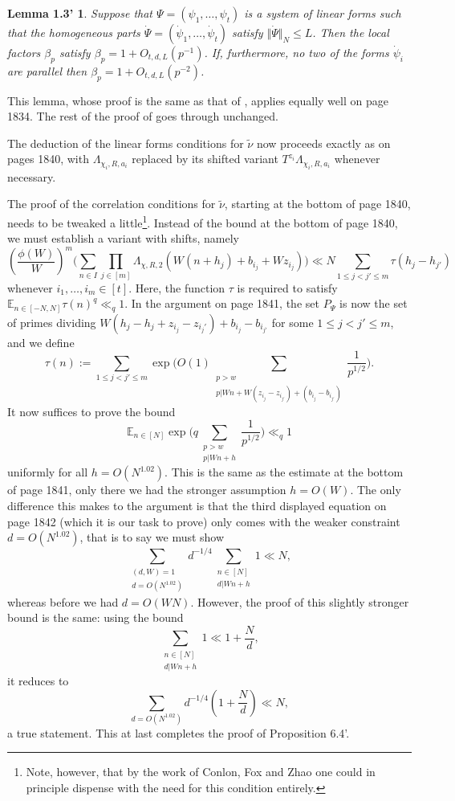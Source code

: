 \documentclass[11pt]{amsart}
\numberwithin{equation}{section}  %
\theoremstyle{remark}
\theoremstyle{plain}
\newtheorem*{lem13new}{Lemma 1.3'}
\numberwithin{equation}{section}
\newcommand{\E}{\mathbb{E}}  %
\renewcommand{\leq}{\leqslant}
\renewcommand{\(}{\left(}
\renewcommand{\)}{\right)}
\begin{document}
\begin{lem13new} Suppose that $\Psi = (\psi_1,\dots, \psi_t)$ is a system of linear forms such that the homogeneous parts $\dot\Psi = (\dot\psi_1,\dots,\dot\psi_t)$ satisfy $\Vert \dot\Psi\Vert_N \leq L$. Then the local factors $\beta_p$ satisfy $\beta_p = 1 + O_{t,d,L}(p^{-1})$. If, furthermore, no two of the forms $\dot\psi_i$ are parallel then $\beta_p = 1 + O_{t,d,L}(p^{-2})$.
\end{lem13new}

This lemma, whose proof is the same as that of \cite[Lemma 1.3]{gt-linearprimes}, applies equally well on page 1834. The rest of the proof of \cite[Theorem D.3]{gt-linearprimes} goes through unchanged.


The deduction of the linear forms conditions for $\tilde\nu$ now proceeds exactly as on pages 1840, with $\Lambda_{\chi_i,R,a_i}$ replaced by its shifted variant $T^{z_i} \Lambda_{\chi_i, R, a_i}$ whenever necessary.

The proof of the correlation conditions for $\tilde \nu$, starting at the bottom of page 1840, needs to be tweaked a little\footnote{Note, however, that by the work of Conlon, Fox and Zhao \cite{cfz} one could in principle dispense with the need for this condition entirely.}. Instead of the bound at the bottom of page 1840, we must establish a variant with shifts, namely
\[ \left(\frac{\phi(W)}{W}\right)^m \Bigg(\sum_{n \in I}\prod_{j \in [m]} \Lambda_{\chi, R, 2}(W(n + h_j)+ b_{i_j} + Wz_{i_j})  \Bigg) \ll N \sum_{1 \leq j < j' \leq m}\tau(h_j - h_{j'})\] whenever $i_1,\dots, i_m \in [t]$. Here, the function $\tau$ is required to satisfy $\E_{n \in [-N,N]} \tau(n)^q \ll_q 1$. In the argument on page 1841, the set $P_{\Psi}$ is now the set of primes dividing $W(h_j - h_{j} + z_{i_j} - z_{i_j'}) + b_{i_j} - b_{i_{j'}}$ for some $1 \leq j < j' \leq m$, and we define
\[ \tau(n) := \sum_{1 \leq j < j' \leq m} \exp \Bigg(O  (1)\sum_{\substack{p > w \\ p | Wn + W(z_{i_j} - z_{i_{j'}}) + (b_{i_j} - b_{i_{j'}})}} \frac{1}{p^{1/2} }\Bigg) .\]
It now suffices to prove the bound
\[ \E_{n \in [N]} \exp\Bigg(q \sum_{\substack{p > w \\ p | Wn + h}} \frac{1}{p^{1/2}}\Bigg) \ll_q 1\] uniformly for all $h = O(N^{1.02})$. This is the same as the estimate at the bottom of page 1841, only there we had the stronger assumption $h = O(W)$. The only difference this makes to the argument is that the third displayed equation on page 1842 (which it is our task to prove) only comes with the weaker constraint $d = O(N^{1.02})$, that is to say we must show
\[ \sum_{\substack{(d,W) = 1 \\ d = O(N^{1.02})}} d^{-1/4} \sum_{\substack{n \in [N] \\ d | Wn + h}} 1 \ll N,\] whereas before we had $d = O(WN)$. However, the proof of this slightly stronger bound is the same: using the bound
\[ \sum_{\substack{n \in [N] \\ d | Wn + h}} 1 \ll 1 + \frac{N}{d},\] it reduces to
\[ \sum_{d = O(N^{1.02})} d^{-1/4} \left(1 + \frac{N}{d}\right) \ll N,\] a true statement. This at last completes the proof of Proposition 6.4'.
\end{document}
